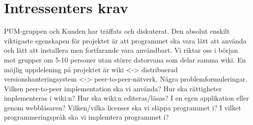 \section{Intressenters krav}
PUM-gruppen och Kunden har träffats och diskuterat. Den absolut enskilt viktigaste egenskapen för projektet är att programmet ska vara lätt att använda och lätt att installera men fortfarande vara användbart.  Vi riktar oss i början mot grupper om 5-10 personer utan större datorvana som delar samma wiki. En möjlig uppdelening på projektet är wiki <-> distribuerad versionshanteringsystem <-> peer-to-peer-nätverk. Några problemformuleringar. Vilken peer-to-peer implementation ska vi använda? Hur ska rättigheter implementeras i wiki:n? Hur ska wiki:n editeras/läsas? I en egen applikation eller genom webbläsaren? Vilken/vilka licenser ska vi släppa programmet i? I vilket programmeringspråk ska vi implemtera programmet i?
